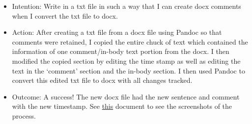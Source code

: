 \documentclass{article}
\begin{document}
\begin{itemize}
    \item Intention: Write in a txt file in such a way that I can create docx comments when I convert the txt file to docx.
    \item Action: After creating a txt file from a docx file using Pandoc so that comments were retained, I copied the entire chuck of text which contained the information of one comment/in-body text portion from the docx. I then modified the copied section by editing the time stamp as well as editing the text in the `comment' section and the in-body section. I then used Pandoc to convert this edited txt file to docx with all changes tracked.
    \item Outcome: A success! The new docx file had the new sentence and comment with the new timestamp. See \href{https://github.com/MQ-FOAR705/Version-Control-Supervisor-Feedback-PoC/blob/master/aa/Contents.md}{this} document to see the screenshots of the process. 
\end{itemize}
\end{document}
